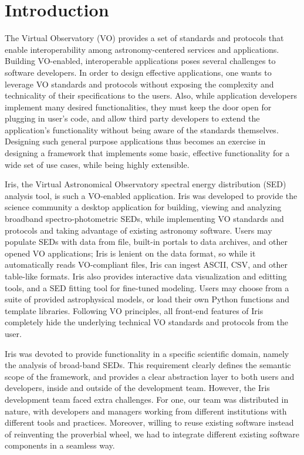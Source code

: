 \section{Introduction} 
The Virtual Observatory (VO) provides a set of standards and protocols that enable interoperability among astronomy-centered services and applications. Building VO-enabled, interoperable applications poses several challenges to software developers. In order to design effective applications, one wants to leverage VO standards and protocols without exposing the complexity and technicality of their specifications to the users. Also, while application developers implement many desired functionalities, they must keep the door open for plugging in user's code, and allow third party developers to extend the application's functionality without being aware of the standards themselves. Designing such general purpose applications thus becomes an exercise in designing a framework that implements some basic, effective functionality for a wide set of use cases, while being highly extensible.

Iris, the Virtual Astronomical Observatory spectral energy distribution (SED) analysis tool, is such a VO-enabled application. Iris was developed to provide the science community a desktop application for building, viewing and analyzing broadband spectro-photometric SEDs, while implementing VO standards and protocols and taking advantage of existing astronomy software. Users may populate SEDs with data from file, built-in portals to data archives, and other opened VO applications; Iris is lenient on the data format, so while it automatically reads VO-compliant files, Iris can ingest ASCII, CSV, and other table-like formats. Iris also provides interactive data visualization and editting tools, and a SED fitting tool for fine-tuned modeling. Users may choose from a suite of provided astrophysical models, or load their own Python functions and template libraries. Following VO principles, all front-end features of Iris completely hide the underlying technical VO standards and protocols from the user.

Iris was devoted to provide functionality in a specific scientific domain, namely the analysis of broad-band SEDs. This requirement clearly defines the semantic scope of the framework, and provides a clear abstraction layer to both users and developers, inside and outside of the development team. However, the Iris development team faced extra challenges. For one, our team was distributed in nature, with developers and managers working from different institutions with different tools and practices. Moreover, willing to reuse existing software instead of reinventing the proverbial wheel, we had to integrate different existing software components in a seamless way.

